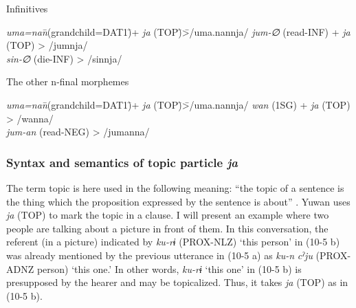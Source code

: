   \ex Infinitives
    \begin{tabbing}
    \textit{uma=nan}\hspace{\tabcolsep}\=\hspace{\tabcolsep}(grandchild=DAT1)\hspace{\tabcolsep}\=\hspace{\tabcolsep}+  \textit{ja} (TOP)\hspace{\tabcolsep}\=\hspace{\tabcolsep}>\hspace{\tabcolsep}\=\hspace{\tabcolsep}/uma.nannja/\kill
    \textit{jum-∅} \> (read-INF) \>  +  \textit{ja} (TOP) \> > \> /jumnja/\\
    \textit{sin-∅} \> (die-INF)  \>                       \> > \> /sinnja/\\
    \end{tabbing}

  \ex The other n-final morphemes
    \begin{tabbing}
    \textit{uma=nan}\hspace{\tabcolsep}\=\hspace{\tabcolsep}(grandchild=DAT1)\hspace{\tabcolsep}\=\hspace{\tabcolsep}+  \textit{ja} (TOP)\hspace{\tabcolsep}\=\hspace{\tabcolsep}>\hspace{\tabcolsep}\=\hspace{\tabcolsep}/uma.nannja/\kill
    \textit{wan}    \> (1SG)      \>    +  \textit{ja} (TOP) \> > \> /wanna/  \\
    \textit{jum-an} \> (read-NEG) \>                         \> > \> /jumanna/\\
    \end{tabbing}
\z
\z

\subsubsection{Syntax and semantics of topic particle \textit{ja}}\label{sec:10.1.1.2}

The term topic is here used in the following meaning: “the topic of a sentence is the thing which the proposition expressed by the sentence is about” \citep[118]{Lambrecht1994}. Yuwan uses \textit{ja} (TOP) to mark the topic in a clause. I will present an example where two people are talking about a picture in front of them. In this conversation, the referent (in a picture) indicated by \textit{ku-rɨ} (PROX-NLZ) ‘this person’ in (10-5 b) was already mentioned by the previous utterance in (10-5 a) as \textit{ku-n} \textit{cˀju} (PROX-ADNZ person) ‘this one.’ In other words, \textit{ku-rɨ} ‘this one’ in (10-5 b) is presupposed by the hearer and may be topicalized. Thus, it takes \textit{ja} (TOP) as in (10-5 b).

